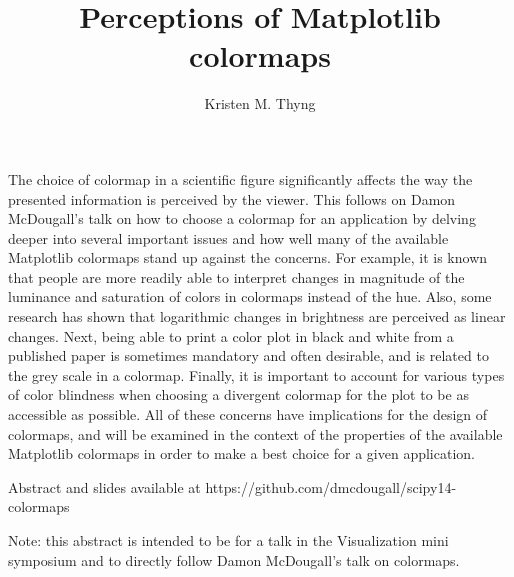 \documentclass[11pt]{article}
\title{Perceptions of Matplotlib colormaps}
\author{Kristen M. Thyng}
\date{}
\begin{document}
\maketitle

The choice of colormap in a scientific figure significantly affects the way the presented information is perceived by the viewer. This follows on Damon McDougall's talk on how to choose a colormap for an application by delving deeper into several important issues and how well many of the available Matplotlib colormaps stand up against the concerns. For example, it is known that people are more readily able to interpret changes in magnitude of the luminance and saturation of colors in colormaps instead of the hue. Also, some research has shown that logarithmic changes in brightness are perceived as linear changes. Next, being able to print a color plot in black and white from a published paper is sometimes mandatory and often desirable, and is related to the grey scale in a colormap. Finally, it is important to account for various types of color blindness when choosing a divergent colormap for the plot to be as accessible as possible. All of these concerns have implications for the design of colormaps, and will be examined in the context of the properties of the available Matplotlib colormaps in order to make a best choice for a given application.

Abstract and slides available at https://github.com/dmcdougall/scipy14-colormaps

Note: this abstract is intended to be for a talk in the Visualization mini symposium and to directly follow Damon McDougall's talk on colormaps.
\end{document}
